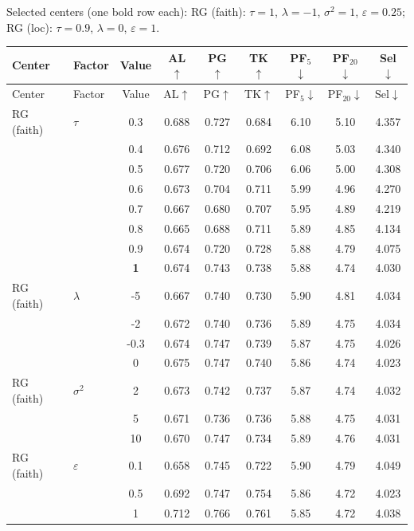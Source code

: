 \noindent Selected centers (one bold row each): RG (faith): $\tau{=}1$, $\lambda{=}{-}1$, $\sigma^2{=}1$, $\varepsilon{=}0.25$; RG (loc): $\tau{=}0.9$, $\lambda{=}0$, $\varepsilon{=}1$.\par
\begin{longtable}{@{}l l c c c c c c c@{}}
\toprule
Center & Factor & Value & AL$\uparrow$ & PG$\uparrow$ & TK$\uparrow$ & PF$_5$$\downarrow$ & PF$_{20}$$\downarrow$ & Sel$\downarrow$ \\
\midrule
\endfirsthead
\toprule
Center & Factor & Value & AL$\uparrow$ & PG$\uparrow$ & TK$\uparrow$ & PF$_5$$\downarrow$ & PF$_{20}$$\downarrow$ & Sel$\downarrow$ \\
\midrule
\endhead
\bottomrule
\endlastfoot
RG (faith) & $\tau$ & 0.3 & 0.688 & 0.727 & 0.684 & 6.10 & 5.10 & 4.357 \\
 &  & 0.4 & 0.676 & 0.712 & 0.692 & 6.08 & 5.03 & 4.340 \\
 &  & 0.5 & 0.677 & 0.720 & 0.706 & 6.06 & 5.00 & 4.308 \\
 &  & 0.6 & 0.673 & 0.704 & 0.711 & 5.99 & 4.96 & 4.270 \\
 &  & 0.7 & 0.667 & 0.680 & 0.707 & 5.95 & 4.89 & 4.219 \\
 &  & 0.8 & 0.665 & 0.688 & 0.711 & 5.89 & 4.85 & 4.134 \\
 &  & 0.9 & 0.674 & 0.720 & 0.728 & 5.88 & 4.79 & 4.075 \\
 &  & \textbf{1} & 0.674 & 0.743 & 0.738 & 5.88 & 4.74 & 4.030 \\
\midrule
RG (faith) & $\lambda$ & {-}5 & 0.667 & 0.740 & 0.730 & 5.90 & 4.81 & 4.034 \\
 &  & {-}2 & 0.672 & 0.740 & 0.736 & 5.89 & 4.75 & 4.034 \\
 &  & {-}0.3 & 0.674 & 0.747 & 0.739 & 5.87 & 4.75 & 4.026 \\
 &  & 0 & 0.675 & 0.747 & 0.740 & 5.86 & 4.74 & 4.023 \\
\midrule
RG (faith) & $\sigma^2$ & 2 & 0.673 & 0.742 & 0.737 & 5.87 & 4.74 & 4.032 \\
 &  & 5 & 0.671 & 0.736 & 0.736 & 5.88 & 4.75 & 4.031 \\
 &  & 10 & 0.670 & 0.747 & 0.734 & 5.89 & 4.76 & 4.031 \\
\midrule
RG (faith) & $\varepsilon$ & 0.1 & 0.658 & 0.745 & 0.722 & 5.90 & 4.79 & 4.049 \\
 &  & 0.5 & 0.692 & 0.747 & 0.754 & 5.86 & 4.72 & 4.023 \\
 &  & 1 & 0.712 & 0.766 & 0.761 & 5.85 & 4.72 & 4.038 \\

\end{longtable}
